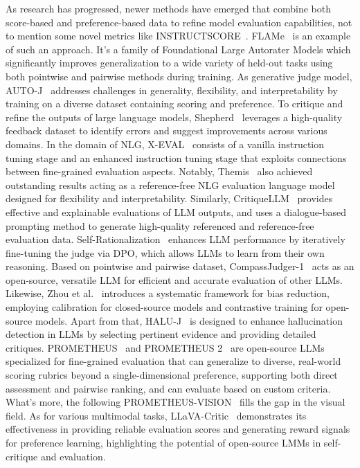 As research has progressed, newer methods have emerged that combine both score-based and preference-based data to refine model evaluation capabilities, not to mention some novel metrics like INSTRUCTSCORE~\cite{xu2023instructscore}.
FLAMe~\cite{vu2024foundational} is an example of such an approach. It's a family of Foundational Large Autorater Models which significantly improves generalization to a wide variety of held-out tasks using both pointwise and pairwise methods during training.
As generative judge model, AUTO-J~\cite{li2023generative} addresses challenges in generality, flexibility, and interpretability by training on a diverse dataset containing scoring and preference.
To critique and refine the outputs of large language models, Shepherd~\cite{wang2023shepherd} leverages a high-quality feedback dataset to identify errors and suggest improvements across various domains.
In the domain of NLG, X-EVAL~\cite{liu2023x} consists of a vanilla instruction tuning stage and an enhanced instruction tuning stage that exploits connections between fine-grained evaluation aspects.
Notably, Themis~\cite{hu2024themis} also achieved outstanding results acting as a reference-free NLG evaluation language model designed for flexibility and interpretability.
Similarly, CritiqueLLM~\cite{ke2024critiquellm} provides effective and explainable evaluations of LLM outputs, and uses a dialogue-based prompting method to generate high-quality referenced and reference-free evaluation data.
Self-Rationalization~\cite{trivedi2024self} enhances LLM performance by iteratively fine-tuning the judge via DPO, which allows LLMs to learn from their own reasoning.
Based on pointwise and pairwise dataset, CompassJudger-1~\cite{cao2024compassjudger} acts as an open-source, versatile LLM for efficient and accurate evaluation of other LLMs.
Likewise, Zhou et al.~\cite{zhou2024mitigating} introduces a systematic framework for bias reduction, employing calibration for closed-source models and contrastive training for open-source models.
Apart from that, HALU-J~\cite{wang2024halu} is designed to enhance hallucination detection in LLMs by selecting pertinent evidence and providing detailed critiques.
PROMETHEUS~\cite{kim2023prometheus} and PROMETHEUS 2~\cite{kim2024prometheus} are open-source LLMs specialized for fine-grained evaluation that can generalize to diverse, real-world scoring rubrics beyond a single-dimensional preference, supporting both direct assessment and pairwise ranking, and can evaluate based on custom criteria. What's more, the following PROMETHEUS-VISION~\cite{lee2024prometheusvision} fills the gap in the visual field.
As for various multimodal tasks, LLaVA-Critic~\cite{xiong2024llava} demonstrates its effectiveness in providing reliable evaluation scores and generating reward signals for preference learning, highlighting the potential of open-source LMMs in self-critique and evaluation.



